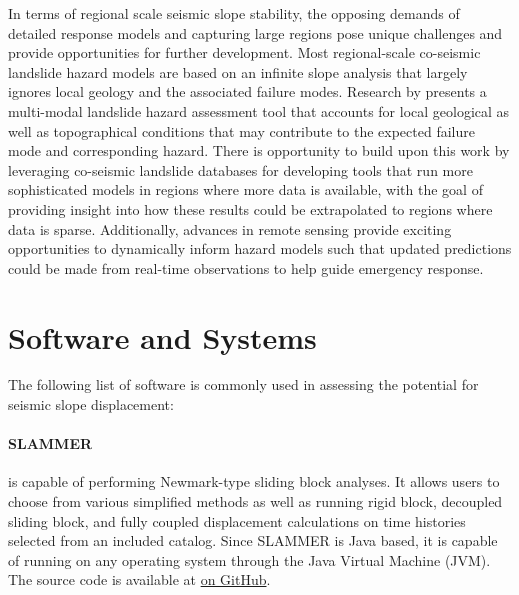 In terms of regional scale seismic slope stability, the opposing demands of detailed response models and capturing large regions pose unique challenges and provide opportunities for further development. Most regional-scale co-seismic landslide hazard models are based on an infinite slope analysis that largely ignores local geology and the associated failure modes. Research by \citet{grant2016multimodal} presents a multi-modal landslide hazard assessment tool that accounts for local geological as well as topographical conditions that may contribute to the expected failure mode and corresponding hazard. There is opportunity to build upon this work by leveraging co-seismic landslide databases for developing tools that run more sophisticated models in regions where more data is available, with the goal of providing insight into how these results could be extrapolated to regions where data is sparse. Additionally, advances in remote sensing provide exciting opportunities to dynamically inform hazard models such that updated predictions could be made from real-time observations to help guide emergency response.


\section{Software and Systems}
\label{sec:eq_landslide_tools}

The following list of software is commonly used in assessing the potential for seismic slope displacement:

\paragraph{SLAMMER}
 \citep{jibson2013slammer} is capable of performing Newmark-type sliding block analyses. It allows users to choose from various simplified methods as well as running rigid block, decoupled sliding block, and fully coupled displacement calculations on time histories selected from an included catalog. Since SLAMMER is Java based, it is capable of running on any operating system through the Java Virtual Machine (JVM). The source code is available at \href{https://github.com/mjibson/slammer}{on GitHub}.

